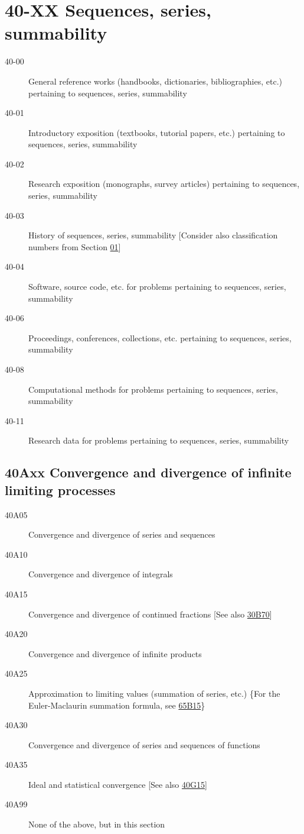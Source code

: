\section*{40-XX Sequences, series, summability }\label{40-XX}
\begin{description}
\item [40-00]\label{40-00} General reference works (handbooks, dictionaries, bibliographies, etc.) pertaining to sequences, series, summability
\item [40-01]\label{40-01} Introductory exposition (textbooks, tutorial papers, etc.) pertaining to sequences, series, summability
\item [40-02]\label{40-02} Research exposition (monographs, survey articles) pertaining to sequences, series, summability
\item [40-03]\label{40-03} History of sequences, series, summability [Consider also classification numbers from Section \hyperref[01-XX]{01}]
\item [40-04]\label{40-04} Software, source code, etc. for problems pertaining to sequences, series, summability
\item [40-06]\label{40-06} Proceedings, conferences, collections, etc. pertaining to sequences, series, summability
\item [40-08]\label{40-08} Computational methods for problems pertaining to sequences, series, summability
\item [40-11]\label{40-11} Research data for problems pertaining to sequences, series, summability
\end{description}
\subsection*{40Axx  Convergence and divergence of infinite limiting processes }\label{40Axx}
\begin{description}  
\item [40A05]\label{40A05} Convergence and divergence of series and sequences
\item [40A10]\label{40A10} Convergence and divergence of integrals
\item [40A15]\label{40A15} Convergence and divergence of continued fractions [See also \hyperref[30B70]{30B70}]
\item [40A20]\label{40A20} Convergence and divergence of infinite products
\item [40A25]\label{40A25} Approximation to limiting values (summation of series, etc.) \{For the Euler-Maclaurin summation formula, see \hyperref[65B15]{65B15}\}
\item [40A30]\label{40A30} Convergence and divergence of series and sequences of functions
\item [40A35]\label{40A35} Ideal and statistical convergence [See also \hyperref[40G15]{40G15}]
\item [40A99]\label{40A99} None of the above, but in this section
\end{description}

